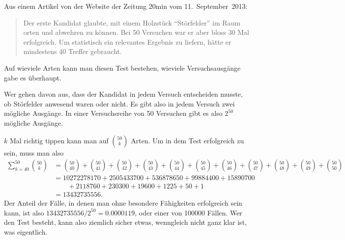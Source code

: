 Aus einem Artikel von der Website der Zeitung 20min vom 11.~September~2013:
\begin{quotation}
Der erste Kandidat glaubte, mit einem Holzstück ``Störfelder'' im Raum
orten und abwehren zu können.
Bei 50 Versuchen war er aber bloss 30 Mal erfolgreich. Um statistisch
ein relevantes Ergebnis zu liefern, hätte er mindestens 40 Treffer gebraucht.
\end{quotation}
Auf wieviele Arten kann man diesen Test bestehen, wieviele Versuchsausgänge
gabe es überhaupt.

\begin{loesung}
Wer gehen davon aus, dass der Kandidat in jedem Versuch entscheiden musste,
ob Störfelder anwesend waren oder nicht. Es gibt also in jedem Versuch
zwei mögliche Ausgänge. In einer Versuchsreihe von 50 Versuchen gibt
es also $2^{50}$ mögliche Ausgänge.

$k$ Mal richtig tippen kann man auf
$\binom{50}{k}$ Arten. Um in dem Test erfolgreich zu sein, muss man also
\begin{align*}
\sum_{k=40}^{50}\binom{50}{k}
&=
\binom{50}{40}
+
\binom{50}{41}
+
\binom{50}{42}
+
\binom{50}{43}
+
\binom{50}{44}
+
\binom{50}{45}
+
\binom{50}{46}
+
\binom{50}{47}
+
\binom{50}{48}
+
\binom{50}{49}
+
\binom{50}{50}
\\
&=
10272278170
+
2505433700
+
536878650
+
99884400
+
15890700
\\
&\qquad+
2118760
+
230300
+
19600
+
1225
+
50
+
1
\\
&=13432735556.
\end{align*}
Der Anteil der Fälle, in denen man ohne besondere Fähigkeiten 
erfolgreich sein kann, ist also $13432735556/2^{50}=0.0000119$,
oder einer von 100000 Fällen. Wer den Test besteht, kann also ziemlich
sicher etwas, wenngleich nicht ganz klar ist, was eigentlich.
\end{loesung}
